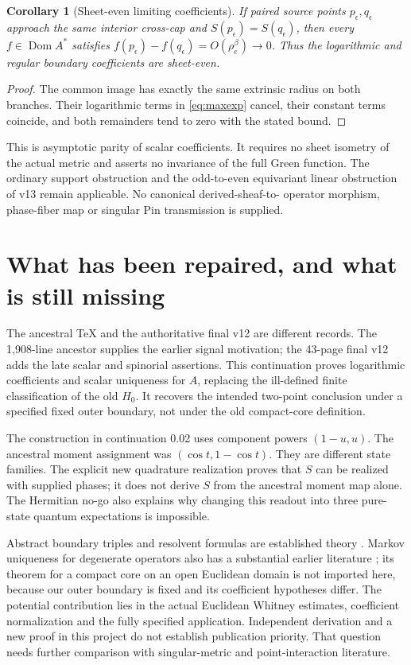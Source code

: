 \documentclass[11pt]{article}
\newtheorem{corollary}[theorem]{Corollary}
\theoremstyle{remark}\newtheorem{remark}[theorem]{Remark}
\newcommand{\Dom}{\operatorname{Dom}}\newcommand{\dd}{\,d}
\begin{document}
\begin{corollary}[Sheet-even limiting coefficients]\label{cor:parity}
If paired source points $p_\epsilon,q_\epsilon$ approach the same interior
cross-cap and $S(p_\epsilon)=S(q_\epsilon)$, then every
$f\in\Dom A^*$ satisfies
$f(p_\epsilon)-f(q_\epsilon)=O(\rho_e^\beta)\to0$.
Thus the logarithmic and regular boundary coefficients are sheet-even.
\end{corollary}
\begin{proof}
The common image has exactly the same extrinsic radius on both branches.
Their logarithmic terms in \eqref{eq:maxexp} cancel, their constant terms
coincide, and both remainders tend to zero with the stated bound.
\end{proof}
This is asymptotic parity of scalar coefficients. It requires no sheet
isometry of the actual metric and asserts no invariance of the full Green
function. The ordinary support obstruction and the odd-to-even equivariant
linear obstruction of v13 remain applicable. No canonical derived-sheaf-to-
operator morphism, phase-fiber map or singular Pin transmission is supplied.

\section{What has been repaired, and what is still missing}\label{sec:comparison}
The ancestral TeX and the authoritative final v12 are different records.
The 1,908-line ancestor supplies the earlier signal motivation; the 43-page
final v12 adds the late scalar and spinorial assertions. This continuation
proves logarithmic coefficients and scalar uniqueness for $A$, replacing the
ill-defined finite classification of the old $H_0$. It recovers the intended
two-point conclusion under a specified fixed outer boundary, not under the
old compact-core definition.

The construction in continuation 0.02 uses component powers $(1-u,u)$.
The ancestral moment assignment was $(\cos t,1-\cos t)$. They are different
state families. The explicit new quadrature realization proves that $S$ can
be realized with supplied phases; it does not derive $S$ from the ancestral
moment map alone. The Hermitian no-go also explains why changing this
readout into three pure-state quantum expectations is impossible.

Abstract boundary triples and resolvent formulas are established theory
\cite{pos}. Markov uniqueness for degenerate operators also has a substantial
earlier literature \cite{robsik}; its theorem for a compact core on an open
Euclidean domain is not imported here, because our outer boundary is fixed
and its coefficient hypotheses differ. The potential contribution lies in
the actual Euclidean Whitney estimates, coefficient normalization and the
fully specified application. Independent derivation and a new proof in this
project do not establish publication priority. That question needs further
comparison with singular-metric and point-interaction literature.
\end{document}
